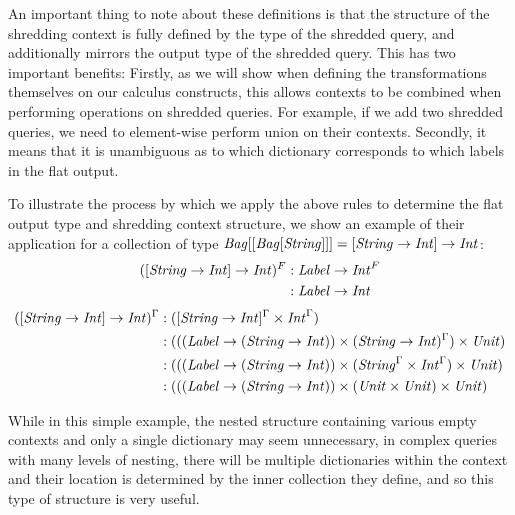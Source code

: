 {{{{An important thing to note about these definitions is that the structure of the shredding context is fully defined by the type of the shredded query, and additionally mirrors the output type of the shredded query. This has two important benefits: Firstly, as we will show when defining the transformations themselves on our calculus constructs, this allows contexts to be combined when performing operations on shredded queries. For example, if we add two shredded queries, we need to element-wise perform union on their contexts. Secondly, it means that it is unambiguous as to which dictionary corresponds to which labels in the flat output.

To illustrate the process by which we apply the above rules to determine the flat output type and shredding context structure, we show an example of their application for a collection of type $\textrm{\textit{Bag}}[[\textrm{\textit{Bag}}[\textrm{\textit{String}}]]] = [\textrm{\textit{String}} \rightarrow \textrm{\textit{Int}}] \rightarrow \textrm{\textit{Int}}$:
\begin{equation*}
\begin{split}
([\textrm{\textit{String}} \rightarrow \textrm{\textit{Int}}] \rightarrow \textrm{\textit{Int}})^F&: \textrm{\textit{Label}} \rightarrow \textrm{\textit{Int}}^F \\
&: \textrm{\textit{Label}} \rightarrow \textrm{\textit{Int}}
\end{split}
\end{equation*}
\begin{equation*}
\begin{split}
([\textrm{\textit{String}} \rightarrow \textrm{\textit{Int}}] \rightarrow \textrm{\textit{Int}})^\Gamma&: ([\textrm{\textit{String}} \rightarrow \textrm{\textit{Int}}]^\Gamma \times \textrm{\textit{Int}}^\Gamma) \\
&: (((\textrm{\textit{Label}} \rightarrow (\textrm{\textit{String}} \rightarrow \textrm{\textit{Int}})) \times (\textrm{\textit{String}} \rightarrow \textrm{\textit{Int}})^\Gamma) \times \textrm{\textit{Unit}}) \\
&: (((\textrm{\textit{Label}} \rightarrow (\textrm{\textit{String}} \rightarrow \textrm{\textit{Int}})) \times (\textrm{\textit{String}}^\Gamma \times \textrm{\textit{Int}}^\Gamma) \times \textrm{\textit{Unit}}) \\
&: (((\textrm{\textit{Label}} \rightarrow (\textrm{\textit{String}} \rightarrow \textrm{\textit{Int}})) \times (\textrm{\textit{Unit}} \times \textrm{\textit{Unit}}) \times \textrm{\textit{Unit}}) \\
\end{split}
\end{equation*}

While in this simple example, the nested structure containing various empty contexts and only a single dictionary may seem unnecessary, in complex queries with many levels of nesting, there will be multiple dictionaries within the context and their location is determined by the inner collection they define, and so this type of structure is very useful.

}

}}}
